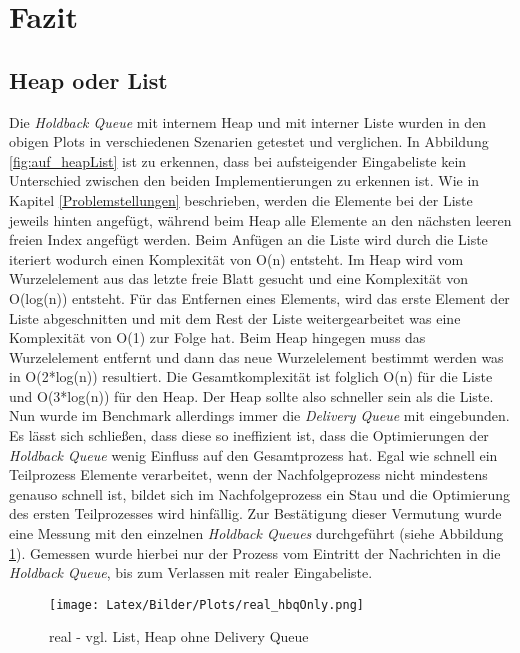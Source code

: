 \section{Fazit}

\subsection{Heap oder List}

Die \textit{Holdback Queue} mit internem Heap und mit interner Liste wurden in den obigen Plots in verschiedenen Szenarien getestet und verglichen. In Abbildung \ref{fig:auf_heapList} ist zu erkennen, dass bei aufsteigender Eingabeliste kein Unterschied zwischen den beiden Implementierungen zu erkennen ist. Wie in Kapitel \ref{Problemstellungen} beschrieben, werden die Elemente bei der Liste jeweils hinten angefügt, während beim Heap alle Elemente an den nächsten leeren freien Index angefügt werden. Beim Anfügen an die Liste wird durch die Liste iteriert wodurch einen Komplexität von O(n) entsteht. Im Heap wird vom Wurzelelement aus das letzte freie Blatt gesucht und eine Komplexität von O(log(n)) entsteht. Für das Entfernen eines Elements, wird das erste Element der Liste abgeschnitten und mit dem Rest der Liste weitergearbeitet was eine Komplexität von O(1) zur Folge hat. Beim Heap hingegen muss das Wurzelelement entfernt und dann das neue Wurzelelement bestimmt werden was in O(2*log(n)) resultiert. Die Gesamtkomplexität ist folglich O(n) für die Liste und O(3*log(n)) für den Heap. Der Heap sollte also schneller sein als die Liste.\\
Nun wurde im Benchmark allerdings immer die \textit{Delivery Queue} mit eingebunden. Es lässt sich schließen, dass diese so ineffizient ist, dass die Optimierungen der \textit{Holdback Queue} wenig Einfluss auf den Gesamtprozess hat. Egal wie schnell ein Teilprozess Elemente verarbeitet, wenn der Nachfolgeprozess nicht mindestens genauso schnell ist, bildet sich im Nachfolgeprozess ein Stau und die Optimierung des ersten Teilprozesses wird hinfällig. Zur Bestätigung dieser Vermutung wurde eine Messung mit den einzelnen \textit{Holdback Queues} durchgeführt (siehe Abbildung \ref{fig:real_hbqOnly}). Gemessen wurde hierbei nur der Prozess vom Eintritt der Nachrichten in die \textit{Holdback Queue}, bis zum Verlassen mit realer Eingabeliste.

\begin{figure}[htbp]
\begin{center}
\texttt{[image: Latex/Bilder/Plots/real\_hbqOnly.png]}
\caption{\label{fig:real_hbqOnly} real - vgl. List, Heap ohne Delivery Queue} 
\end{center}
\end{figure}

